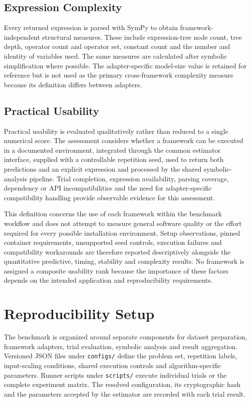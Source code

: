 \documentclass[12pt,oneside,bibtotoc,liststotoc]{scrbook}
\begin{document}
\subsection{Expression Complexity}

Every returned expression is parsed with SymPy to obtain framework-independent structural measures. These include expression-tree node count, tree depth, operator count and operator set, constant count and the number and identity of variables used. The same measures are calculated after symbolic simplification where possible. The adapter-specific model-size value is retained for reference but is not used as the primary cross-framework complexity measure because its definition differs between adapters.

\subsection{Practical Usability}

Practical usability is evaluated qualitatively rather than reduced to a single numerical score. The assessment considers whether a framework can be executed in a documented environment, integrated through the common estimator interface, supplied with a controllable repetition seed, used to return both predictions and an explicit expression and processed by the shared symbolic-analysis pipeline. Trial completion, expression availability, parsing coverage, dependency or API incompatibilities and the need for adapter-specific compatibility handling provide observable evidence for this assessment.

This definition concerns the use of each framework within the benchmark workflow and does not attempt to measure general software quality or the effort required for every possible installation environment. Setup observations, pinned container requirements, unsupported seed controls, execution failures and compatibility workarounds are therefore reported descriptively alongside the quantitative predictive, timing, stability and complexity results. No framework is assigned a composite usability rank because the importance of these factors depends on the intended application and reproducibility requirements.

\section{Reproducibility Setup}

The benchmark is organized around separate components for dataset preparation, framework adapters, trial evaluation, symbolic analysis and result aggregation. Versioned JSON files under \texttt{configs/} define the problem set, repetition labels, input-scaling conditions, shared execution controls and algorithm-specific parameters. Runner scripts under \texttt{scripts/} execute individual trials or the complete experiment matrix. The resolved configuration, its cryptographic hash and the parameters accepted by the estimator are recorded with each trial result.
\end{document}
